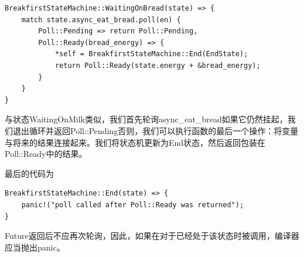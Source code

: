 \begin{lstlisting}[caption=WaitingOnBread Branch]
BreakfirstStateMachine::WaitingOnBread(state) => {
    match state.async_eat_bread.poll(en) {
        Poll::Pending => return Poll::Pending,
        Poll::Ready(bread_energy) => {
            *self = BreakfirstStateMachine::End(EndState);
            return Poll::Ready(state.energy + &bread_energy);
        }
    }
} 
\end{lstlisting}
与状态WaitingOnMilk类似，我们首先轮询async\_eat\_bread如果它仍然挂起，我们退出循环并返回Poll::Pending否则，我们可以执行函数的最后一个操作：将变量与将来的结果连接起来。我们将状态机更新为End状态，然后返回包装在Poll::Ready中的结果。

最后的代码为

\begin{lstlisting}[caption=End Branch]
BreakfirstStateMachine::End(state) => {
    panic!("poll called after Poll::Ready was returned");
} 
\end{lstlisting}
Future返回后不应再次轮询，因此，如果在对于已经处于该状态时被调用，编译器应当抛出panic。
